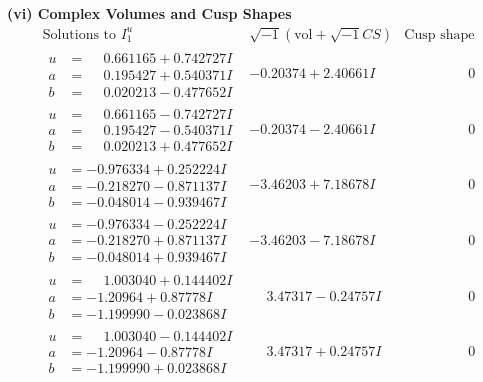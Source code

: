 \documentclass[1p]{elsarticle_modified}
\theoremstyle{definition}
\newcommand{\I}{\sqrt{-1}}
\begin{document}
\newpage\flushleft \textbf{(vi) Complex Volumes and Cusp Shapes}
$$\begin{array}{c|c|c}  
\text{Solutions to }I^u_{1}& \I (\text{vol} + \sqrt{-1}CS) & \text{Cusp shape}\\
 \hline 
\begin{aligned}
u &= \phantom{-}0.661165 + 0.742727 I \\
a &= \phantom{-}0.195427 + 0.540371 I \\
b &= \phantom{-}0.020213 - 0.477652 I\end{aligned}
 & -0.20374 + 2.40661 I & \phantom{-0.000000 } 0 \\ \hline\begin{aligned}
u &= \phantom{-}0.661165 - 0.742727 I \\
a &= \phantom{-}0.195427 - 0.540371 I \\
b &= \phantom{-}0.020213 + 0.477652 I\end{aligned}
 & -0.20374 - 2.40661 I & \phantom{-0.000000 } 0 \\ \hline\begin{aligned}
u &= -0.976334 + 0.252224 I \\
a &= -0.218270 - 0.871137 I \\
b &= -0.048014 - 0.939467 I\end{aligned}
 & -3.46203 + 7.18678 I & \phantom{-0.000000 } 0 \\ \hline\begin{aligned}
u &= -0.976334 - 0.252224 I \\
a &= -0.218270 + 0.871137 I \\
b &= -0.048014 + 0.939467 I\end{aligned}
 & -3.46203 - 7.18678 I & \phantom{-0.000000 } 0 \\ \hline\begin{aligned}
u &= \phantom{-}1.003040 + 0.144402 I \\
a &= -1.20964 + 0.87778 I \\
b &= -1.199990 - 0.023868 I\end{aligned}
 & \phantom{-}3.47317 - 0.24757 I & \phantom{-0.000000 } 0 \\ \hline\begin{aligned}
u &= \phantom{-}1.003040 - 0.144402 I \\
a &= -1.20964 - 0.87778 I \\
b &= -1.199990 + 0.023868 I\end{aligned}
 & \phantom{-}3.47317 + 0.24757 I & \phantom{-0.000000 } 0 \\ \hline\begin{aligned}

\end{aligned}
\end{array}$$
\end{document}
